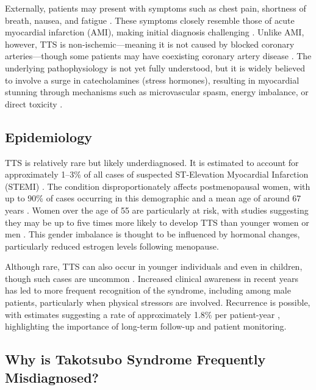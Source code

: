 \documentclass[12pt, BSc]{muthesis}
\begin{document}
Externally, patients may present with symptoms such as chest pain, shortness of breath, nausea, and fatigue \cite{Wallströme011820}. These symptoms closely resemble those of acute myocardial infarction (AMI), making initial diagnosis challenging \cite{PRASAD2008408, LuLei2015}. Unlike AMI, however, TTS is non-ischemic—meaning it is not caused by blocked coronary arteries—though some patients may have coexisting coronary artery disease \cite{PRASAD2008408, RODRIGUEZ201925}. The underlying pathophysiology is not yet fully understood, but it is widely believed to involve a surge in catecholamines (stress hormones), resulting in myocardial stunning through mechanisms such as microvascular spasm, energy imbalance, or direct toxicity \cite{Pelliccia2017}.


\subsection{Epidemiology}

TTS is relatively rare but likely underdiagnosed. It is estimated to account for approximately 1--3\% of all cases of suspected ST-Elevation Myocardial Infarction (STEMI) \cite{Ghadri2018}. The condition disproportionately affects postmenopausal women, with up to 90\% of cases occurring in this demographic and a mean age of around 67 years \cite{Ghadri2018}. Women over the age of 55 are particularly at risk, with studies suggesting they may be up to five times more likely to develop TTS than younger women or men \cite{Ghadri2018}. This gender imbalance is thought to be influenced by hormonal changes, particularly reduced estrogen levels following menopause.

Although rare, TTS can also occur in younger individuals and even in children, though such cases are uncommon \cite{Gianni2006}. Increased clinical awareness in recent years has led to more frequent recognition of the syndrome, including among male patients, particularly when physical stressors are involved. Recurrence is possible, with estimates suggesting a rate of approximately 1.8\% per patient-year \cite{Templin2015}, highlighting the importance of long-term follow-up and patient monitoring.

\subsection{Why is Takotsubo Syndrome Frequently Misdiagnosed?}
\end{document}
